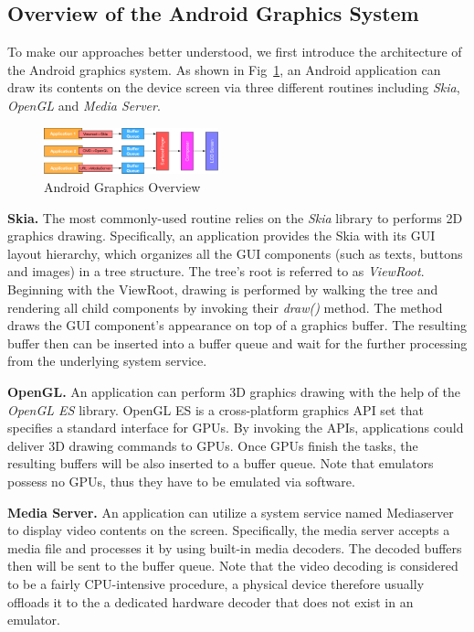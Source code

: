 \documentclass[conference]{IEEEtranl}
\begin{document}
	\subsection{Overview of the Android Graphics System}
	To make our approaches better understood, we first introduce the architecture of the Android graphics system. As shown in Fig~\ref{fig:graphics}, an Android application can draw its contents on the device screen via three different routines including \textit{Skia}, \textit{OpenGL} and \textit{Media Server}.

	\begin{figure}[t]
	\centering 
	\captionsetup{justification=centering}
	\includegraphics[width=0.45\textwidth]{Figures/graphics}

	\caption{Android Graphics Overview}
	\vspace{-0.3in}
	\label{fig:graphics}
	\end{figure}

	\textbf{Skia.} The most commonly-used routine relies on the \textit{Skia} library to performs 2D graphics drawing. Specifically, an application provides the Skia with its GUI layout hierarchy, which organizes all the GUI components (such as texts, buttons and images) in a tree structure. The tree's root is referred to as \textit{ViewRoot}. Beginning with the ViewRoot, drawing is performed by walking the tree and rendering all child components by invoking their \textit{draw()} method. The method draws the GUI component's appearance on top of a graphics buffer. The resulting buffer then can be inserted into a buffer queue and wait for the further processing from the underlying system service.

	\textbf{OpenGL.} An application can perform 3D graphics drawing with the help of the \textit{OpenGL ES} library. OpenGL ES is a cross-platform graphics API set that specifies a standard interface for GPUs. By invoking the APIs, applications could deliver 3D drawing commands to GPUs. Once GPUs finish the tasks, the resulting buffers will be also inserted to a buffer queue. Note that emulators possess no GPUs, thus they have to be emulated via software.

	\textbf{Media Server.} An application can utilize a system service named Mediaserver to display video contents on the screen. Specifically, the media server accepts a media file and processes it by using built-in media decoders. The decoded buffers then will be sent to the buffer queue. Note that the video decoding is considered to be a fairly CPU-intensive procedure, a physical device therefore usually offloads it to the a dedicated hardware decoder that does not exist in an emulator. 
	 
\end{document}
